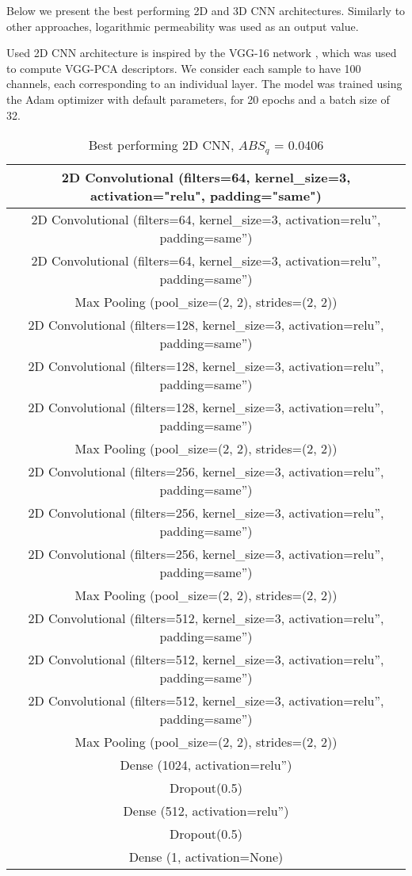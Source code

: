 \documentclass[review]{elsarticle}
\begin{document}
Below we present the best performing 2D and 3D CNN architectures. Similarly to other approaches, logarithmic permeability was used as an output value.

Used 2D CNN architecture is inspired by the VGG-16 network \cite{lecun2015deep}, which was used to compute VGG-PCA descriptors. We consider each sample to have 100 channels, each corresponding to an individual layer. The model was trained using the Adam optimizer with default parameters, for 20 epochs and a batch size of 32.

\begin{table}[H]
  \centering
  \caption{Best performing 2D CNN, $ABS_q$ = 0.0406} \label{tab:tab7}
  \begin{tabular}{ | c |}
    \hline
    2D Convolutional (filters=64, kernel\_size=3, activation="relu", padding="same") \\ \hline
    2D Convolutional (filters=64, kernel\_size=3, activation=relu”, padding=same”) \\ \hline
    2D Convolutional (filters=64, kernel\_size=3, activation=relu”, padding=same”) \\ \hline
    Max Pooling (pool\_size=(2, 2), strides=(2, 2)) \\ \hline
    2D Convolutional (filters=128, kernel\_size=3, activation=relu”, padding=same”) \\ \hline
    2D Convolutional (filters=128, kernel\_size=3, activation=relu”, padding=same”) \\ \hline
    2D Convolutional (filters=128, kernel\_size=3, activation=relu”, padding=same”) \\ \hline
    Max Pooling (pool\_size=(2, 2), strides=(2, 2)) \\ \hline
    2D Convolutional (filters=256, kernel\_size=3, activation=relu”, padding=same”) \\ \hline
    2D Convolutional (filters=256, kernel\_size=3, activation=relu”, padding=same”) \\ \hline
    2D Convolutional (filters=256, kernel\_size=3, activation=relu”, padding=same”) \\ \hline
    Max Pooling (pool\_size=(2, 2), strides=(2, 2)) \\ \hline
    2D Convolutional (filters=512, kernel\_size=3, activation=relu”, padding=same”) \\ \hline
    2D Convolutional (filters=512, kernel\_size=3, activation=relu”, padding=same”) \\ \hline
    2D Convolutional (filters=512, kernel\_size=3, activation=relu”, padding=same”) \\ \hline
    Max Pooling (pool\_size=(2, 2), strides=(2, 2)) \\ \hline
    Dense (1024, activation=relu”) \\ \hline
    Dropout(0.5) \\ \hline
    Dense (512, activation=relu”) \\ \hline
    Dropout(0.5) \\ \hline
    Dense (1, activation=None) \\ \hline
  \end{tabular}
\end{table}
\end{document}
